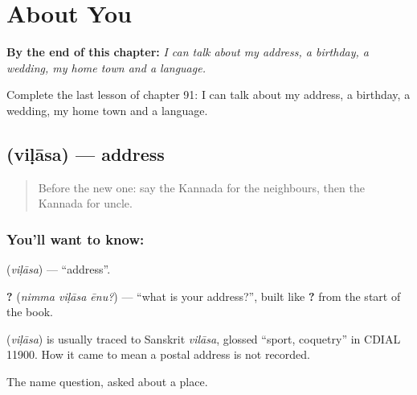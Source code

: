 
\chapter{About You}
\label{ch:ka-about-you}

\begin{chapteropening}
\textbf{By the end of this chapter:} \emph{I can talk about my address, a birthday, a wedding, my home town and a language.}

Complete the last lesson of chapter 91: I can talk about my address, a birthday, a wedding, my home town and a language.
\end{chapteropening}

\section[\texorpdfstring{\kn{ವಿಳಾಸ} (viḷāsa)}{ವಿಳಾಸ (viḷāsa)}]{ (viḷāsa) — address}

\label{lesson:KA-C91-address}



\begin{quote}
Before the new one: say the Kannada for the neighbours, then the Kannada for uncle.
\end{quote}

\subsection*{You'll want to know: }
\textbf{} (\emph{viḷāsa}) — \textquotedblleft{}address\textquotedblright{}.

\textbf{  ?} (\emph{nimma viḷāsa ēnu?}) — \textquotedblleft{}what is your address?\textquotedblright{}, built like \textbf{  ?} from the start of the book.

\begin{cousinweb}
\textbf{} (\emph{viḷāsa}) is usually traced to Sanskrit \emph{vilāsa}, glossed \textquotedblleft{}sport, coquetry\textquotedblright{} in CDIAL 11900. How it came to mean a postal address is not recorded.
\end{cousinweb}

\begin{grammarlens}[title={What you've built}]
The name question, asked about a place.
\end{grammarlens}

